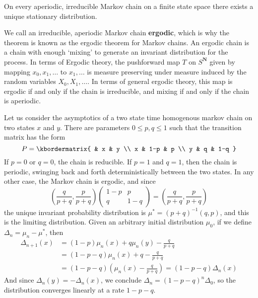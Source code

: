 \begin{corollary}
    On every aperiodic, irreducible Markov chain on a finite state space there exists a unique stationary distribution.
\end{corollary}

We call an irreducible, aperiodic Markov chain {\bf ergodic}, which is why the theorem is known as the ergodic theorem for Markov chains. An ergodic chain is a chain with enough `mixing' to generate an invariant distribution for the process. In terms of Ergodic theory, the pushforward map $T$ on $S^{\mathbf{N}}$ given by mapping $x_0, x_1, \dots$ to $x_1, \dots$ is measure preserving under measure induced by the random variables $X_0, X_1, \dots$. In terms of general ergodic theory, this map is ergodic if and only if the chain is irreducible, and mixing if and only if the chain is aperiodic.

\begin{example}
    Let us consider the asymptotics of a two state time homogenous markov chain on two states $x$ and $y$. There are parameters $0 \leq p,q \leq 1$ such that the transition matrix has the form
    \[ P = \kbordermatrix{ & x & y \\ x & 1-p & p \\ y & q & 1-q } \]
    If $p = 0$ or $q = 0$, the chain is reducible. If $p = 1$ and $q = 1$, then the chain is periodic, swinging back and forth deterministically between the two states. In any other case, the Markov chain is ergodic, and since
    \[ \left( \frac{q}{p + q}, \frac{p}{p + q} \right) \begin{pmatrix} 1-p & p \\ q & 1-q \end{pmatrix} = \left( \frac{q}{p+q}, \frac{p}{p+q} \right) \]
    the unique invariant probability distribution is $\mu^* = (p + q)^{-1}(q,p)$, and this is the limiting distribution. Given an arbitrary initial distribution $\mu_0$,  if we define $\Delta_n = \mu_n - \mu^*$, then
    \begin{align*}
        \Delta_{n+1}(x) &= (1-p) \mu_n(x) + q \mu_n(y) - \frac{q}{p+q}\\
        &= (1 - p - q) \mu_n(x) + q - \frac{q}{p+q}\\
        &= (1 - p - q) \left(\mu_n(x) - \frac{q}{p+q} \right) = (1 - p - q) \Delta_n(x)
    \end{align*}
    And since $\Delta_n(y) = -\Delta_n(x)$, we conclude $\Delta_n = (1 - p - q)^n \Delta_0$, so the distribution converges linearly at a rate $1 - p - q$.
\end{example}

